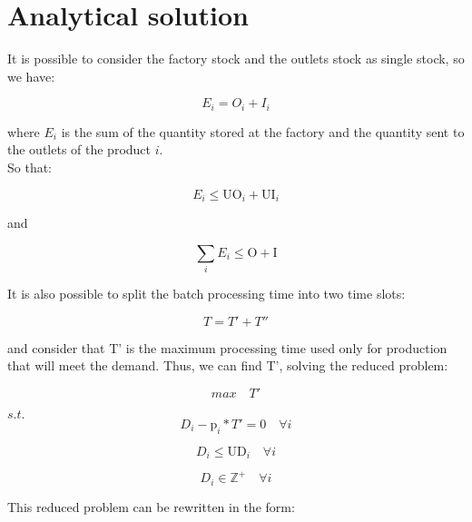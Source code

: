 \documentclass[preprint,12pt,authoryear]{elsarticle}
\begin{document}
\section{Analytical solution}
\label{sec:analyticalSol}

It is possible to consider the factory stock and the outlets stock as single stock, so we have:

\begin{equation}
E_i = O_i + I_i
\end{equation}

where $E_i$ is the sum of the quantity stored at the factory and the quantity sent to the outlets of the product $i$. \\

So that:

\begin{equation}
E_i \leq \textrm{UO}_i + \textrm{UI}_i
\end{equation}

and

\begin{equation}
\sum_i {E_i} \leq \textrm{O} + \textrm{I}
\end{equation}


It is also possible to split the batch processing time into two time slots:

\begin{equation}
T = T' + T''
\end{equation}

and consider that T' is the maximum processing time used only for production that will meet the demand. Thus, we can find T', solving the reduced problem:


\begin{equation}
max \quad T'
\end{equation}

$s.t.$ \\

\begin{equation}
D_i - \textrm{p}_i * T'  = 0 \quad \forall i
\end{equation}

\begin{equation}
D_i \leq \textrm{UD}_i \quad \forall i
\end{equation}

\begin{equation}
D_i \in  \mathbb{Z}^+ \quad \forall i
\end{equation}

This reduced problem can be rewritten in the form:
\end{document}
